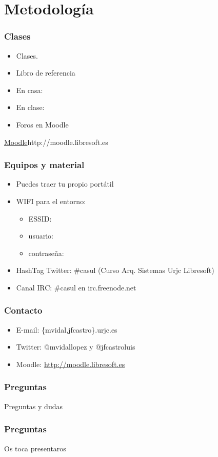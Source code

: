 \documentclass{beamer}
\begin{document}
\section{Metodología}
\begin{frame}
\frametitle{Clases}

\begin{itemize}
\item Clases. 
\item Libro de referencia
\item En casa: 
\item En clase: 
\item Foros en Moodle
\end{itemize}

\begin{center}
\url{Moodle}{http://moodle.libresoft.es}
\end{center}

\end{frame}


\begin{frame}
\frametitle{Equipos y material}

\begin{itemize}
\item Puedes traer tu propio portátil
\item WIFI para el entorno:
\begin{itemize}
\item ESSID:   
\item usuario: 
\item contraseña: 
\end{itemize}
\item HashTag Twitter: \#casul (Curso Arq. Sistemas Urjc Libresoft)
\item Canal IRC: \#casul en irc.freenode.net
\end{itemize}

\end{frame}

\begin{frame}
\frametitle{Contacto}
\begin{itemize}
\item E-mail: \{mvidal,jfcastro\}\@gsyc.urjc.es
\item Twitter: @mvidallopez y @jfcastroluis
\item Moodle: \url{http://moodle.libresoft.es}

\end{itemize}
\end{frame}

\begin {frame}
\frametitle{Preguntas}
\begin{center}
\huge{Preguntas y dudas}
\end{center}
\end{frame}

\begin {frame}
\frametitle{Preguntas}
\begin{center}
\huge{Os toca presentaros}
\end{center}
\end{frame}
\end{document}
